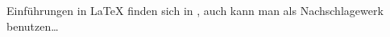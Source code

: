 \documentclass{article}
\begin{document}
Einführungen in \LaTeX{} finden sich in
\cite{voss2012,mittelbach2008}, auch kann man \cite{voss2010a} als
Nachschlagewerk benutzen\dots
\printbibliography
\end{document}
